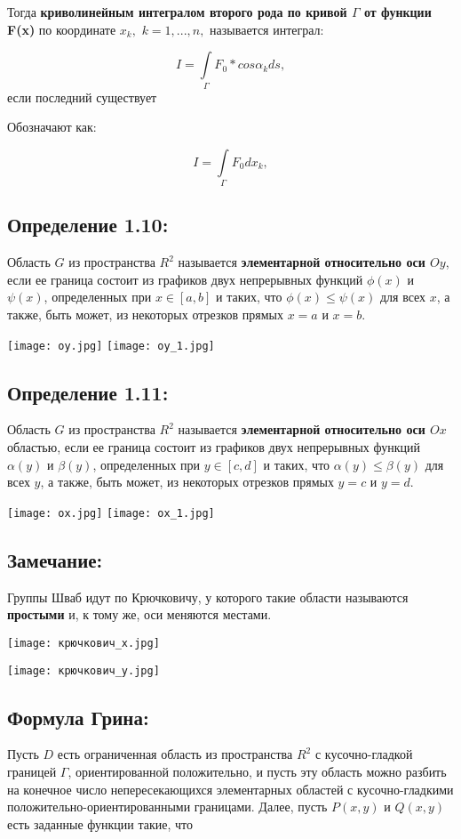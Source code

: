 \documentclass{article}
\begin{document}
Тогда \textbf{криволинейным интегралом второго рода по кривой $\Gamma$ от функции F(x)} по координате $x_k,$ $ k = 1,...,n,$ называется интеграл:

	$$I = \int\limits_{\Gamma}{} F_0 * cos \alpha_k d{s},$$
	если последний существует
	
	Обозначают как:
	
		$$I = \int\limits_{\Gamma}{} F_0 d{x_k},$$
	\newpage
\subsection*{Определение 1.10:}
	Область $G$ из пространства $R^2$ называется \textbf{элементарной относительно оси $Oy$}, если ее граница состоит из графиков двух непрерывных функций $\phi(x)$ и $\psi(x)$, определенных при
$x \in [a, b]$ и таких, что $\phi(x)	\leq \psi(x)$ для всех $x$, а также, быть
может, из некоторых отрезков прямых $x = a$ и $x = b$.


\texttt{[image: oy.jpg]}
\texttt{[image: oy\_1.jpg]}

\subsection*{Определение 1.11:}
	Область $G$ из пространства $R^2$ называется \textbf{элементарной относительно оси $Ox$} областью, если ее граница состоит из графиков двух непрерывных функций $\alpha(y)$ и $\beta(y)$, определенных при
$y \in [c, d]$ и таких, что $\alpha(y)	\leq \beta(y)$ для всех $y$, а также, быть
может, из некоторых отрезков прямых $y = c$ и $y = d$.


\texttt{[image: ox.jpg]}
\texttt{[image: ox\_1.jpg]}
\newpage
\subsection*{Замечание:}
	Группы Шваб идут по Крючковичу, у которого такие области называются \textbf{простыми} и, к тому же, оси меняются местами.
	
	
\texttt{[image: крючкович\_x.jpg]}

\texttt{[image: крючкович\_y.jpg]}
\newpage
\subsection*{Формула Грина:}
	Пусть $D$ есть ограниченная область из пространства $R^2$
с кусочно-гладкой границей $\Gamma$, ориентированной положительно, и пусть
эту область можно разбить на конечное число непересекающихся элементарных областей с кусочно-гладкими положительно-ориентированными границами. Далее, пусть $P(x, y)$ и $Q(x, y)$ есть заданные функции
такие, что 
\end{document}
